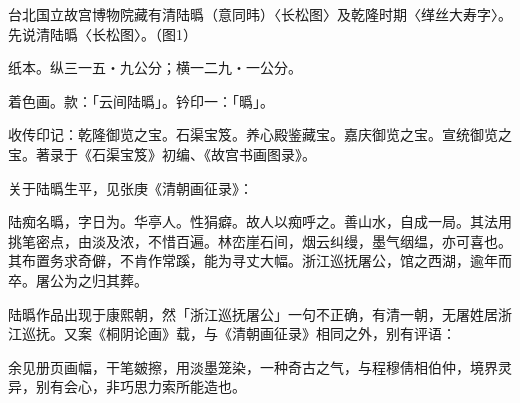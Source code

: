 
台北国立故宫博物院藏有清陆㬙（意同𬀩）〈长松图〉及乾隆时期〈缂丝大寿字〉。先说清陆㬙〈长松图〉。（图1）

纸本。纵三一五‧九公分；横一二九‧一公分。

着色画。款：「云间陆㬙」。钤印一：「㬙」。

收传印记：乾隆御览之宝。石渠宝笈。养心殿鉴藏宝。嘉庆御览之宝。宣统御览之宝。著录于《石渠宝笈》初编、《故宫书画图录》。

关于陆㬙生平，见张庚《清朝画征录》：

\begin{BookQuote}
陆痴名㬙，字日为。华亭人。性狷癖。故人以痴呼之。善山水，自成一局。其法用挑笔密点，由淡及浓，不惜百遍。林峦崖石间，烟云纠缦，墨气𬘡缊，亦可喜也。其布置务求奇僻，不肯作常蹊，能为寻丈大幅。浙江巡抚屠公，馆之西湖，逾年而卒。屠公为之归其葬。
\end{BookQuote}

陆㬙作品出现于康熙朝，然「浙江巡抚屠公」一句不正确，有清一朝，无屠姓居浙江巡抚。又案《桐阴论画》载，与《清朝画征录》相同之外，别有评语：

\begin{BookQuote}
余见册页画幅，干笔皴擦，用淡墨笼染，一种奇古之气，与程穆倩相伯仲，境界灵异，别有会心，非巧思力索所能造也。
\end{BookQuote}

\vfill
\begin{BookNotes}
\end{BookNotes}

